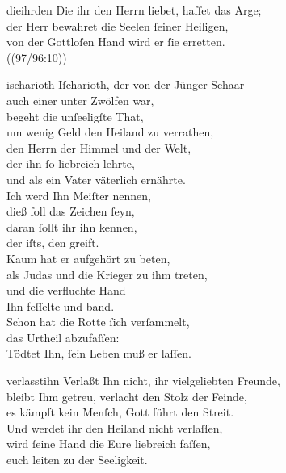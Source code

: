 \documentclass[tocstyle=ref-genre]{ees}
\begin{document}
{  \begin{movement}{dieihrden}
    \voice[Coro]
    Die ihr den Herrn liebet, haſſet das Arge;\\
    der Herr bewahret die Seelen ſeiner Heiligen,\\
    von der Gottloſen Hand wird er ſie erretten.\\
    ((97/96:10))
  \end{movement}

  \begin{movement}{ischarioth}
    \voice[Soprano]
    Iſcharioth, der von der Jünger Schaar\\
    auch einer unter Zwölfen war,\\
    begeht die unſeeligſte That,\\
    um wenig Geld den Heiland zu verrathen,\\
    den Herrn der Himmel und der Welt,\\
    der ihn ſo liebreich lehrte,\\
    und als ein Vater väterlich ernährte.\\
    Ich werd Ihn Meiſter nennen,\\
    dieß ſoll das Zeichen ſeyn,\\
    daran ſollt ihr ihn kennen,\\
    der iſts, den greift.\\
    Kaum hat er aufgehört zu beten,\\
    als Judas und die Krieger zu ihm treten,\\
    und die verfluchte Hand\\
    Ihn feſſelte und band.\\
    Schon hat die Rotte ſich verſammelt,\\
    das Urtheil abzufaſſen:\\
    Tödtet Ihn, ſein Leben muß er laſſen.
  \end{movement}
  \clearpage
  \begin{movement}{verlasstihn}
    \voice[Soprano]
    Verlaßt Ihn nicht, ihr vielgeliebten Freunde,\\
    bleibt Ihm getreu, verlacht den Stolz der Feinde,\\
    es kämpft kein Menſch, Gott führt den Streit.\\[1ex]
    Und werdet ihr den Heiland nicht verlaſſen,\\
    wird ſeine Hand die Eure liebreich faſſen,\\
    euch leiten zu der Seeligkeit.
  \end{movement}

}
\end{document}
